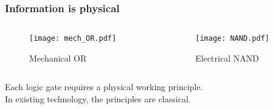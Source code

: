 \begin{frame}
\frametitle{Information is physical}

\begin{columns}
  \begin{column}{0.5\textwidth}
    \begin{figure}
    \texttt{[image: mech\_OR.pdf]}
    \caption*{Mechanical OR}
    \end{figure}
  \end{column}

  \pause
  \begin{column}{0.5\textwidth}
    \begin{figure}
    \texttt{[image: NAND.pdf]}
    \caption*{Electrical NAND}
    \end{figure}
  \end{column}
\end{columns}

Each logic gate requires a physical working principle.\\
In existing technology, the principles are classical.
\end{frame}
